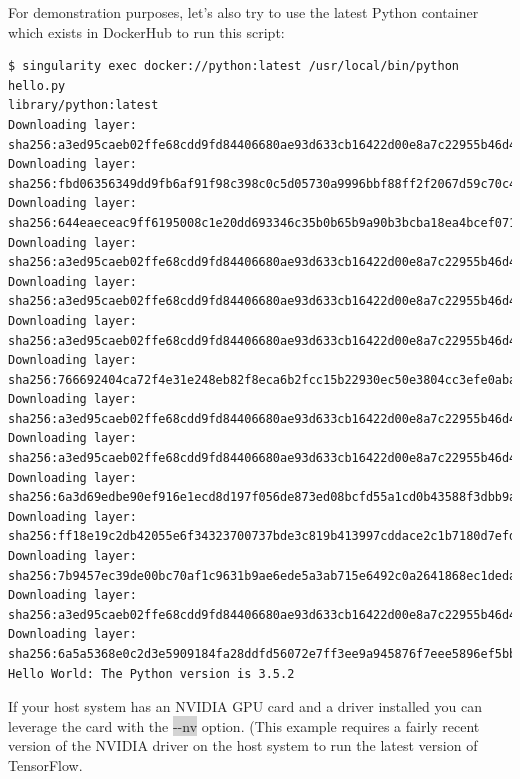 \documentclass[a4paper]{article}
\newcounter{subsubsubsection}[subsubsection]
\begin{document}
For demonstration purposes, let’s also try to use the latest Python container which exists in DockerHub to run this script:

\begin{lstlisting}[frame=single]
$ singularity exec docker://python:latest /usr/local/bin/python hello.py
library/python:latest
Downloading layer: sha256:a3ed95caeb02ffe68cdd9fd84406680ae93d633cb16422d00e8a7c22955b46d4
Downloading layer: sha256:fbd06356349dd9fb6af91f98c398c0c5d05730a9996bbf88ff2f2067d59c70c4
Downloading layer: sha256:644eaeceac9ff6195008c1e20dd693346c35b0b65b9a90b3bcba18ea4bcef071
Downloading layer: sha256:a3ed95caeb02ffe68cdd9fd84406680ae93d633cb16422d00e8a7c22955b46d4
Downloading layer: sha256:a3ed95caeb02ffe68cdd9fd84406680ae93d633cb16422d00e8a7c22955b46d4
Downloading layer: sha256:a3ed95caeb02ffe68cdd9fd84406680ae93d633cb16422d00e8a7c22955b46d4
Downloading layer: sha256:766692404ca72f4e31e248eb82f8eca6b2fcc15b22930ec50e3804cc3efe0aba
Downloading layer: sha256:a3ed95caeb02ffe68cdd9fd84406680ae93d633cb16422d00e8a7c22955b46d4
Downloading layer: sha256:a3ed95caeb02ffe68cdd9fd84406680ae93d633cb16422d00e8a7c22955b46d4
Downloading layer: sha256:6a3d69edbe90ef916e1ecd8d197f056de873ed08bcfd55a1cd0b43588f3dbb9a
Downloading layer: sha256:ff18e19c2db42055e6f34323700737bde3c819b413997cddace2c1b7180d7efd
Downloading layer: sha256:7b9457ec39de00bc70af1c9631b9ae6ede5a3ab715e6492c0a2641868ec1deda
Downloading layer: sha256:a3ed95caeb02ffe68cdd9fd84406680ae93d633cb16422d00e8a7c22955b46d4
Downloading layer: sha256:6a5a5368e0c2d3e5909184fa28ddfd56072e7ff3ee9a945876f7eee5896ef5bb
Hello World: The Python version is 3.5.2
\end{lstlisting}
	
	
	If your host system has an NVIDIA GPU card and a driver installed you can leverage the card with the \colorbox{lightgray}{-{}-nv} option. (This example requires a fairly recent version of the NVIDIA driver on the host system to run the latest version of TensorFlow.
	
\end{document}
